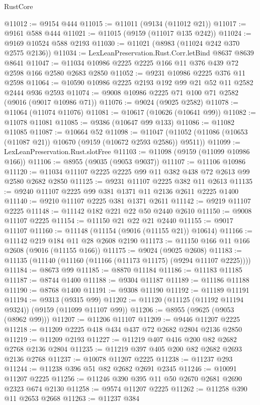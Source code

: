 \begin{lexlean}{RustCore}
\begin{coremodule}
@11012 := @9154 @444
@11015 := @11011 (@9134 (@11012 @21))
@11017 := @9161 @588 @444
@11021 := @11015 (@9159 (@11017 @135 @242))
@11024 := @9169 @10524 @588 @2193
@11030 := @11021 (@8983 (@11024 @242 @370 @2575 @2136))
@11034 := LexLeanPreservation.Rust.Corr.letBind @8637 @8639 @8641
@11047 := @11034 @10986 @2225 @2225 @166 @11 @376 @439 @72 @2598 @166 @2580 @2683 @2850
@11052 := @9231 @10986 @2225 @376 @11 @2598
@11064 := @10590 @10986 @2225 @2193 @192 @99 @21 @52 @11 @2582 @2444 @936 @2593
@11074 := @9008 @10986 @2225 @71 @100 @71 @2582 (@9016 (@9017 @10986 @71))
@11076 := @9024 (@9025 @2582)
@11078 := @11064 (@11074 @11076)
@11081 := @10617 (@10626 (@10641 @99))
@11082 := @11078 @11081
@11085 := @9386 (@10647 @99 @133)
@11086 := @11082 @11085
@11087 := @10664 @52
@11098 := @11047 (@11052 (@11086 (@10653 (@11087 @21)) @10670 (@9159 (@10672 @2593 @2586)) @9511))
@11099 := LexLeanPreservation.Rust.slotFree
@11103 := @11098 (@9159 (@11099 @10986 @166))
@11106 := @8955 (@9035 (@9053 @9037))
@11107 := @11106 @10986
@11120 := @11034 @11107 @2225 @2225 @99 @11 @382 @438 @72 @2613 @99 @2580 @2682 @2850
@11125 := @9231 @11107 @2225 @382 @11 @2613
@11135 := @9240 @11107 @2225 @99 @381 @1371 @11 @2136 @2611 @2225 @1400
@11140 := @9210 @11107 @2225 @381 @1371 @2611
@11142 := @9219 @11107 @2225
@11148 := @11142 @182 @221 @22 @50 @2440 @2610
@11150 := @9008 @11107 @2225
@11154 := @11150 @21 @22 @21 @2440
@11155 := @9017 @11107
@11160 := @11148 (@11154 (@9016 (@11155 @21)) @10614)
@11166 := @11142 @219 @184 @11 @28 @2608 @2190
@11173 := @11150 @166 @11 @166 @2608 (@9016 (@11155 @166))
@11175 := @9024 (@9025 @2608)
@11183 := @11135 (@11140 (@11160 (@11166 (@11173 @11175) (@9294 @11107 @2225))))
@11184 := @8673 @99
@11185 := @8870 @11184
@11186 := @11183 @11185
@11187 := @8744 @1400
@11188 := @9304 @11187
@11189 := @11186 @11188
@11190 := @8768 @1400
@11191 := @9308 @11190
@11192 := @11189 @11191
@11194 := @9313 (@9315 @99)
@11202 := @11120 (@11125 (@11192 @11194 @9324)) (@9159 (@11099 @11107 @99))
@11206 := @8955 (@9625 (@9053 (@8962 @99)))
@11207 := @11206 @11107
@11209 := @9446 @11207 @2225
@11218 := @11209 @2225 @418 @434 @437 @72 @2682 @2804 @2136 @2850
@11219 := @11209 @2193
@11227 := @11219 @407 @416 @200 @82 @2682 @2768 @2136 @2804
@11235 := @11219 @397 @405 @200 @82 @2682 @2693 @2136 @2768
@11237 := @10078 @11207 @2225
@11238 := @11237 @293
@11244 := @11238 @396 @51 @82 @2682 @2691 @2345
@11246 := @10091 @11207 @2225
@11256 := @11246 @390 @395 @11 @50 @2670 @2681 @2690 @2323 @674 @2130
@11258 := @9574 @11207 @2225
@11262 := @11258 @390 @11 @2653 @2668
@11263 := @11237 @384

\end{coremodule}
\end{lexlean}
